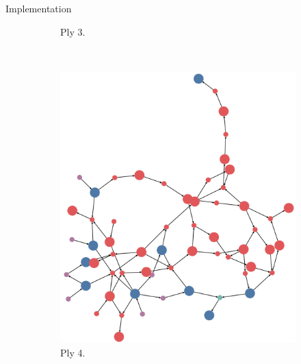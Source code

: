 \documentclass[final]{beamer} %
\begin{document}
\begin{columns}
\begin{column}{.35\textwidth}
\begin{block}{Implementation}
\begin{figure}[!htb]
\begin{subfigure}[!htb]{0.18\columnwidth}
				\caption{Ply 3.}
			\end{subfigure}
			~
			\begin{subfigure}[!htb]{0.18\columnwidth}
				\centering
				\includegraphics[width=\columnwidth]{figures/knn_forward_think_4.png}
				\caption{Ply 4.}
			\end{subfigure}
			~
			\begin{subfigure}[!htb]{0.18\columnwidth}
				\centering

\end{subfigure}
\end{figure}
\end{block}
\end{column}
\end{columns}
\end{document}
